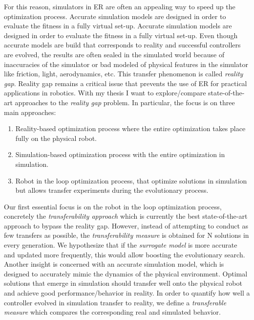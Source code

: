 For this reason, simulators in ER are often an appealing way to speed up the optimization process. Accurate simulation models are designed in order to evaluate the fitness in a fully virtual set-up. Accurate simulation models are designed in order to evaluate the fitness in a fully virtual set-up. Even though accurate models are build that corresponds to reality and successful controllers are evolved, the results are often sealed in the simulated world because of inaccuracies of the simulator or bad modeled of physical features in the simulator like friction, light, aerodynamics, etc. This transfer phenomenon is called \textit{reality gap}. Reality gap remains a critical issue that prevents the use of ER for practical applications in robotics. With my thesis I want to explore/compare state-of-the-art approaches to the \textit{reality gap} problem. In particular, the focus is on three main approaches:

\begin{enumerate}
    \item Reality-based optimization process where the entire optimization takes place fully on the physical robot.
    \item Simulation-based optimization process with the entire optimization in simulation.
    \item Robot in the loop optimization process, that optimize solutions in simulation but allows transfer experiments during the evolutionary process.
\end{enumerate}

Our first essential focus is on the robot in the loop optimization process, concretely the \textit{transferability approach} \cite{koos2012transferability} which is currently the best state-of-the-art approach to bypass the reality gap. However, instead of attempting to conduct as few transfers as possible, the \textit{transferability measure} is obtained for N solutions in every generation. We hypothesize that if the \textit{surrogate model} is more accurate and updated more frequently, this would allow boosting the evolutionary search. Another insight is concerned with an accurate simulation model, which is designed to accurately mimic the dynamics of the physical environment. Optimal solutions that emerge in simulation should transfer well onto the physical robot and achieve good performance/behavior in reality. In order to quantify how well a controller evolved in simulation transfer to reality, we define a \textit{transferable measure} which compares the corresponding real and simulated behavior.

